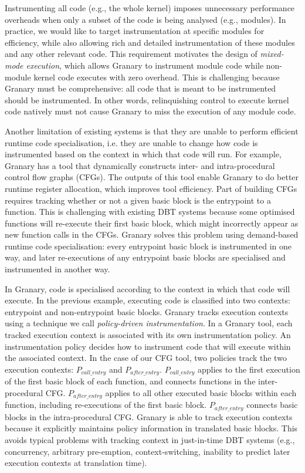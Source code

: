 \documentclass[preprint]{sigplanconf}
\begin{document}
Instrumenting all code (e.g., the whole kernel) imposes unnecessary performance overheads when only a subset of the code is being analysed (e.g., modules). In practice, we would like to target instrumentation at specific modules for efficiency, while also allowing rich and detailed instrumentation of these modules and any other relevant code. This requirement motivates the design of \emph{mixed-mode execution}, which allows Granary to instrument module code while non-module kernel code executes with zero overhead. This is challenging because Granary must be comprehensive: all code that is meant to be instrumented should be instrumented. In other words, relinquishing control to execute kernel code natively must not cause Granary to miss the execution of any module code.

Another limitation of existing systems is that they are unable to perform efficient runtime code specialisation, i.e. they are unable to change how code is instrumented based on the context in which that code will run. For example, Granary has a tool that  dynamically constructs inter- and intra-procedural control flow graphs (CFGs). The outputs of this tool enable Granary to do better runtime register allocation, which improves tool efficiency. Part of building CFGs requires tracking whether or not a given basic block is the entrypoint to a function. This is challenging with existing DBT systems because some optimised functions will re-execute their first basic block, which might incorrectly appear as new function calls in the CFGs. Granary solves this problem using demand-based runtime code specialisation: every entrypoint basic block is instrumented in one way, and later re-executions of any entrypoint basic blocks are specialised and instrumented in another way.

In Granary, code is specialised according to the context in which that code will execute. In the previous example, executing code is classified into two contexts: entrypoint and non-entrypoint basic blocks. Granary tracks execution contexts using a technique we call \emph{policy-driven instrumentation}. In a Granary tool, each tracked execution context is associated with its own instrumentation policy. An instrumentation policy decides how to instrument code that will execute within the associated context. In the case of our CFG tool, two policies track the two execution contexts: $P_{\mathit{call\_entry}}$ and $P_{\mathit{after\_entry}}$. $P_{\mathit{call\_entry}}$ applies to the first execution of the first basic block of each function, and connects functions in the inter-procedural CFG.  $P_{\mathit{after\_entry}}$ applies to all other executed basic blocks within each function, including re-executions of the first basic block. $P_{\mathit{after\_entry}}$ connects basic blocks in the intra-procedural CFG. Granary is able to track execution contexts because it explicitly maintains policy information in translated basic blocks. This avoids typical problems with tracking context in just-in-time DBT systems (e.g., concurrency, arbitrary pre-emption, context-switch\-ing, inability to predict later execution contexts at translation time).
\end{document}
